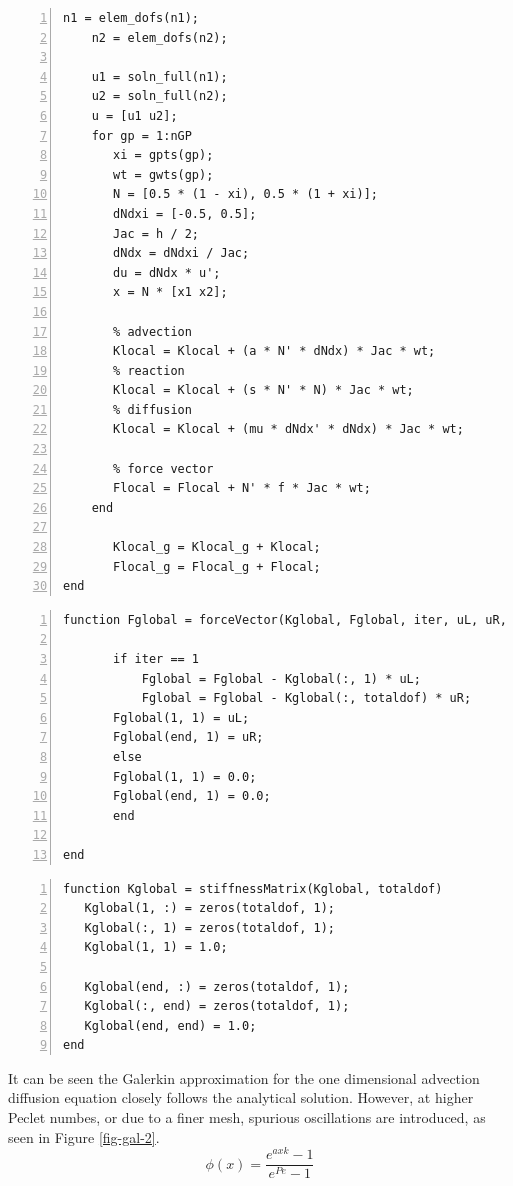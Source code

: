 \documentclass[12pt, oneside]{article}
\begin{document}
\begin{enumerate}
\begin{lstlisting}[frame=single, numbers=left, style=Matlab-editor]
    n1 = elem_dofs(n1);
    n2 = elem_dofs(n2);

    u1 = soln_full(n1);
    u2 = soln_full(n2);
    u = [u1 u2];
    for gp = 1:nGP
	   xi = gpts(gp);
	   wt = gwts(gp);
	   N = [0.5 * (1 - xi), 0.5 * (1 + xi)];
	   dNdxi = [-0.5, 0.5];
	   Jac = h / 2;
	   dNdx = dNdxi / Jac;
	   du = dNdx * u';
	   x = N * [x1 x2];

	   % advection
	   Klocal = Klocal + (a * N' * dNdx) * Jac * wt;
	   % reaction
	   Klocal = Klocal + (s * N' * N) * Jac * wt;
	   % diffusion
	   Klocal = Klocal + (mu * dNdx' * dNdx) * Jac * wt;

	   % force vector
	   Flocal = Flocal + N' * f * Jac * wt;
    end

	   Klocal_g = Klocal_g + Klocal;
	   Flocal_g = Flocal_g + Flocal;
end
       \end{lstlisting}
	      \begin{lstlisting}[frame=single, numbers=left, style=Matlab-editor]
%% Force vector assembly
function Fglobal = forceVector(Kglobal, Fglobal, iter, uL, uR, totaldof)

       if iter == 1
           Fglobal = Fglobal - Kglobal(:, 1) * uL;
           Fglobal = Fglobal - Kglobal(:, totaldof) * uR;
	   Fglobal(1, 1) = uL;
	   Fglobal(end, 1) = uR;
       else
	   Fglobal(1, 1) = 0.0;
	   Fglobal(end, 1) = 0.0;
       end

end
   \end{lstlisting}
	      \begin{lstlisting}[frame=single, numbers=left, style=Matlab-editor]
%% Stiffness Matrix Assembly 
function Kglobal = stiffnessMatrix(Kglobal, totaldof)
   Kglobal(1, :) = zeros(totaldof, 1);
   Kglobal(:, 1) = zeros(totaldof, 1);
   Kglobal(1, 1) = 1.0;

   Kglobal(end, :) = zeros(totaldof, 1);
   Kglobal(:, end) = zeros(totaldof, 1);
   Kglobal(end, end) = 1.0;
end
\end{lstlisting}
\end{enumerate}
It can be seen the Galerkin approximation for the one dimensional advection diffusion equation closely follows the analytical solution. However, at higher Peclet numbes, or due to a finer mesh, spurious oscillations are introduced, as seen in Figure \ref{fig-gal-2}.
\begin{equation} \label{analsol}
    \phi(x) =  \frac{e^{a x k} -1}{e^{Pe} - 1} 
\end{equation} 
\end{document}
